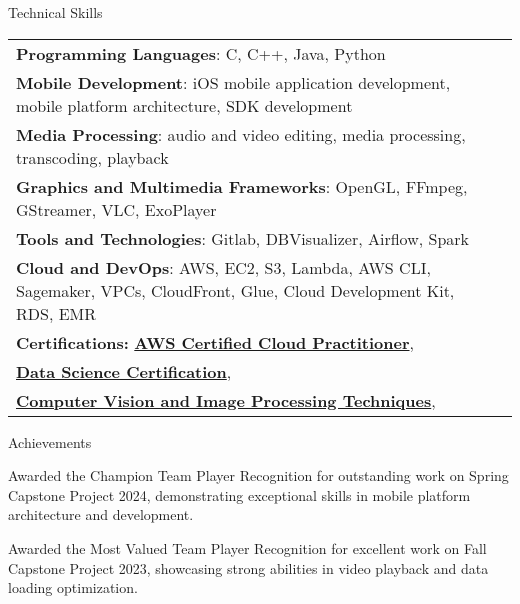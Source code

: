 \documentclass{resume} %
\begin{document}
    \begin{rSection}{Technical Skills}
        \begin{tabular}{ @{} l @{\hspace{1ex}} l }
                                \textbf{Programming Languages}: C, C++, Java, Python\\
                                \textbf{Mobile Development}: iOS mobile application development, mobile platform architecture, SDK development\\
                                \textbf{Media Processing}: audio and video editing, media processing, transcoding, playback\\
                                \textbf{Graphics and Multimedia Frameworks}: OpenGL, FFmpeg, GStreamer, VLC, ExoPlayer\\
                                \textbf{Tools and Technologies}: Gitlab, DBVisualizer, Airflow, Spark\\
                                \textbf{Cloud and DevOps}: AWS, EC2, S3, Lambda, AWS CLI, Sagemaker, VPCs, CloudFront, Glue, Cloud Development Kit, RDS, EMR\\
                        \textbf{Certifications:} 
                                            \href{None}{\textbf{AWS Certified Cloud Practitioner}},\\
                                            \href{None}{\textbf{Data Science Certification}},\\
                                            \href{None}{\textbf{Computer Vision and Image Processing Techniques}},\\
                                 
        \end{tabular}
    \end{rSection}
 

    \begin{rSection}{Achievements}
        \begin{rSubsection}{}{}{}
                            \item Awarded the Champion Team Player Recognition for outstanding work on Spring Capstone Project 2024, demonstrating exceptional skills in mobile platform architecture and development.
                            \item Awarded the Most Valued Team Player Recognition for excellent work on Fall Capstone Project 2023, showcasing strong abilities in video playback and data loading optimization.
                    \end{rSubsection}
    \end{rSection}
\end{document}
